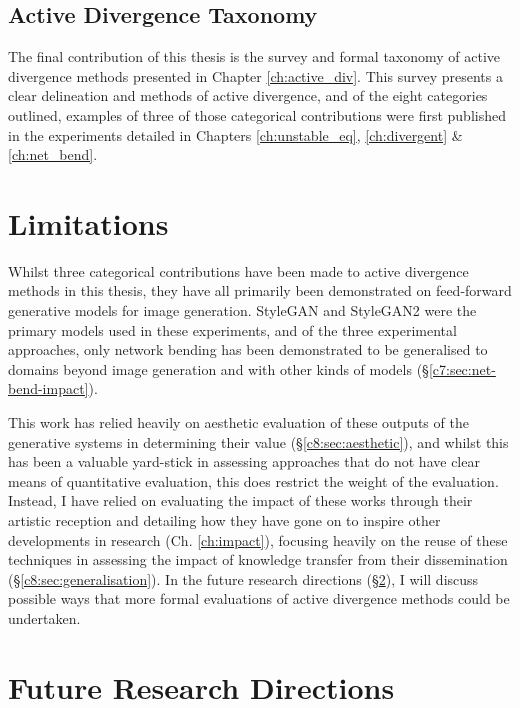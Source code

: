\subsection{Active Divergence Taxonomy}

The final contribution of this thesis is the survey and formal taxonomy of active divergence methods presented in Chapter \ref{ch:active_div}.
This survey presents a clear delineation and methods of active divergence, and of the eight categories outlined, examples of three of those categorical contributions were first published in the experiments detailed in Chapters \ref{ch:unstable_eq}, \ref{ch:divergent} \& \ref{ch:net_bend}.

\section{Limitations}
\label{c9:sec:limitations}

Whilst three categorical contributions have been made to active divergence methods in this thesis, they have all primarily been demonstrated on feed-forward generative models for image generation.
StyleGAN \citep{karras2019style} and StyleGAN2 \citep{karras2019analyzing} were the primary models used in these experiments, and of the three experimental approaches, only network bending has been demonstrated to be generalised to domains beyond image generation and with other kinds of models (\S \ref{c7:sec:net-bend-impact}).

This work has relied heavily on aesthetic evaluation of these outputs of the generative systems in determining their value (\S \ref{c8:sec:aesthetic}), and whilst this has been a valuable yard-stick in assessing approaches that do not have clear means of quantitative evaluation, this does restrict the weight of the evaluation.
Instead, I have relied on evaluating the impact of these works through their artistic reception and detailing how they have gone on to inspire other developments in research (Ch. \ref{ch:impact}), focusing heavily on the reuse of these techniques in assessing the impact of knowledge transfer from their dissemination (\S \ref{c8:sec:generalisation}).
In the future research directions (\S \ref{c9:sec:future}), I will discuss possible ways that more formal evaluations of active divergence methods could be undertaken.

\section{Future Research Directions}
\label{c9:sec:future}

